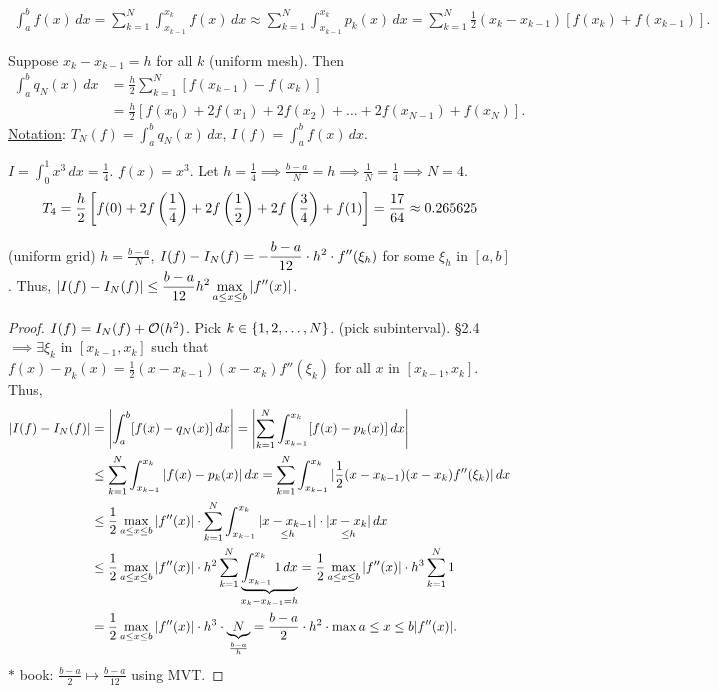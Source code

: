 \documentclass[]{article}
\begin{document}
\begin{proposition}
	\begin{align*}
		\int_a^b f(x)\,dx = \sum_{k=1}^N\int_{x_{k-1}}^{x_k}f(x)\,dx 
						  \approx \sum_{k=1}^N \int_{x_{k-1}}^{x_k} p_k(x)\,dx
						  = \sum_{k=1}^N\frac12(x_k-x_{k-1}) [f(x_k)+f(x_{k-1})].
	\end{align*}
\end{proposition}
Suppose $x_k-x_{k-1}=h$ for all $k$ (uniform mesh).
Then 
\begin{align*}
	\int_a^b q_N(x)\,dx &= \frac h2\sum_{k=1}^N[f(x_{k-1})-f(x_k)] \\
						&= \frac h2[f(x_0)+2f(x_1)+2f(x_2)+\dots+2f(x_{N-1})+f(x_N)].
\end{align*}
\ul{Notation}: $T_N(f) = \int_a^b q_N(x)\,dx$, $I(f) = \int_a^bf(x)\,dx$.
\begin{example}
	$I = \int_0^1x^3\,dx = \frac14$. $f(x)=x^3$.
	Let $h=\frac14 \implies \frac{b-a}N=h \implies \frac1N=\frac14 \implies N=4$.
	\begin{align*}
		T_4 = \frac h2\blr{f(0) + 2f\plr{\frac14} + 2f\plr{\frac12} + 2f\plr{\frac34} + f(1)} 
			= \frac{17}{64} \approx 0.265625
	\end{align*}
\end{example}
\begin{proposition}
	[Accuracy] (uniform grid) $h=\frac{b-a}N$,
	$\ds I(f)-I_N(f) = -\frac{b-a}{12}\cdot h^2\cdot f''(\xi_h) $
	for some $\xi_h$ in $[a,b]$.
	Thus, $\ds|I(f)-I_N(f)|\leq \frac{b-a}{12}h^2 \max_{a\leq x\leq b}|f''(x)|$.
\end{proposition}
\begin{proof}
	$I(f)=I_N(f)+\mc O(h^2)$.
	Pick $k\in\set{1,2,\dots,N}$. (pick subinterval).
	\S2.4 $\implies \exists \xi_k$ in $[x_{k-1},x_k]$ such that $f(x)-p_k(x) = \frac12(x-x_{k-1})(x-x_k)f''(\xi_k)$ for all $x$ in $[x_{k-1},x_k]$.
	Thus,
	\begin{align*}
		|I(f)-I_N(f)| &= \mlr{\int_a^b[f(x)-q_N(x)]\,dx}
					  = \mlr{\sum_{k=1}^N\int_{x_{k-1}}^{x_k} [f(x)-p_k(x)]\,dx} \\
					  &\leq \sum_{k=1}^N\int_{x_{k-1}}^{x_k}|f(x)-p_k(x)|\,dx
					  = \sum_{k=1}^N\int_{x_{k-1}}^{x_k}|\frac12(x-x_{k-1})(x-x_k)f''(\xi_k)|\,dx \\
					  &\leq \frac12\max_{a\leq x\leq b}|f''(x)|\cdot\sum_{k=1}^N\int_{x_{k-1}}^{x_k}\us{\leq h}{|x-x_{k-1}|}\cdot\us{\leq h}{|x-x_k|}\,dx \\
					  &\leq \frac12\max_{a\leq x\leq b}|f''(x)|\cdot h^2\sum_{k=1}^N \ub{x_k-x_{k-1}=h}{\int_{x_{k-1}}^{x_k} 1\,dx}
					  = \frac12\max_{a\leq x\leq b}|f''(x)|\cdot h^3\sum_{k=1}^N1 \\
					  &= \frac12\max_{a\leq x\leq b}|f''(x)|\cdot h^3\cdot \ub{\frac{b-a}h}N
					  = \frac{b-a}2\cdot h^2\cdot\max{a\leq x\leq b}|f''(x)|.
	\end{align*}
	$*$ book: $\frac{b-a}2\mapsto \frac{b-a}{12}$ using MVT.
\end{proof}
\end{document}
